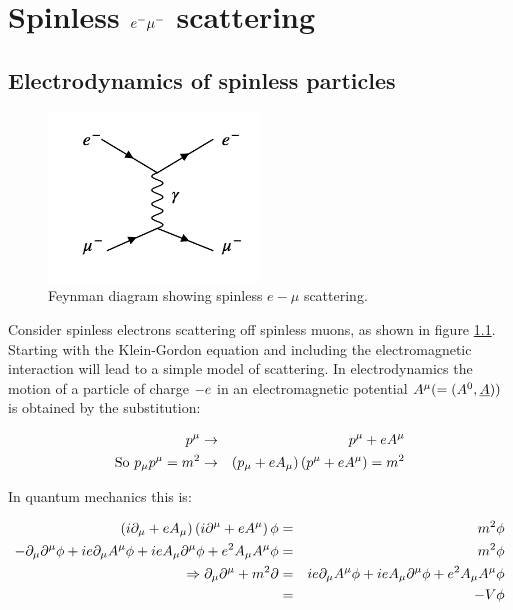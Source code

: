 \chapter{Spinless \texorpdfstring{$\lowercase{e}^- \mu^-$}{EMu} scattering}

\section{Electrodynamics of spinless particles}

\begin{figure}[!htb]
  \begin{center}
    \includegraphics[width=0.5\textwidth]{images/web_feynman/image_20.png}
    \caption[Spinless $e-\mu$ scattering]{Feynman diagram showing spinless $e-\mu$ scattering.}
    \label{fig:ch7_EMuToEMu}
  \end{center}
\end{figure}

Consider spinless electrons scattering off spinless muons, as shown in figure \ref{fig:ch7_EMuToEMu}.  Starting with the Klein-Gordon equation and including the electromagnetic interaction will lead to a simple model of scattering.  In electrodynamics the motion of a particle of charge $-e$ in an electromagnetic potential $A^{\mu} (= (A^0,\underline{A}))$ is obtained by the substitution:

\begin{eqnarray*}
  p^{\mu} & \to & p^{\mu} + e A^{\mu} \\
  \textrm{So } p_{\mu}p^{\mu} = m^2 & \to & \left(p_{\mu} + e A_{\mu} \right)\left(p^{\mu} + e A^{\mu}\right) = m^2
\end{eqnarray*}

In quantum mechanics this is:

\begin{eqnarray*}
  \left(i\partial_{\mu} + e A_{\mu}\right)\left(i\partial^{\mu} + e A^{\mu}\right)\phi & = & m^2 \phi \\
  -\partial_{\mu}\partial^{\mu}\phi + ie \partial_{\mu}A^{\mu}\phi + ie A_{\mu}\partial^{\mu}\phi + e^2A_{\mu}A^{\mu}\phi & = & m^2\phi \\
  \Rightarrow \partial_{\mu}\partial^{\mu} + m^2\partial & = & ie\partial_{\mu}A^{\mu}\phi + ie A_{\mu}\partial^{\mu}\phi + e^2A_{\mu}A^{\mu}\phi \\
  & = & -V\phi
\end{eqnarray*}

